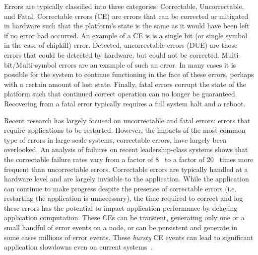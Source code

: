 Errors are typically classified into three categories: Correctable,
Uncorrectable, and Fatal. Correctable errors (CE) are errors that can be
corrected or mitigated in hardware such that the platform's state is the same as it
would have been left if no error had occurred.  An example of a CE is is a single bit 
(or single symbol in the case of chipkill) error.  Detected, uncorrectable errors (DUE) are those
errors that could be detected by hardware, but could not be corrected.
Multi-bit/Multi-symbol errors are an example of such an error.  In many cases
it is possible for the system to continue functioning in the face of these
errors, perhaps with a certain amount of lost state.    Finally, fatal errors corrupt the state of the platform such that continued 
correct operation can no longer be guaranteed.  Recovering from a fatal error typically 
requires a full system halt and a reboot.

Recent research has largely focused on uncorrectable and fatal errors: errors
that require applications to be restarted.  However, the impacts of the most common
type of errors in large-scale systems, correctable errors, have largely been overlooked. An
analysis of failures on recent leadership-class systems shows that the
correctable failure rates vary from a factor of
8~\cite{siddiqua:2017:lifetime,levy:2018:lessons} to a factor of
20~\cite{meza:2015:revisiting} times more frequent than uncorrectable errors.
Correctable errors are typically handled at a hardware level and are largely invisible 
to the application.  While the application can continue to make progress despite the
presence of correctable errors (i.e. restarting the application is unnecessary), the 
time required to correct and log these errors has the potential to impact application
performance by delaying application computation. These CEs can be transient,
generating only one or a small handful of error events on a node, or can be
persistent and generate in some cases millions of error events.    These
\emph{bursty} CE events can lead to significant application slowdowns even on
current systems~\cite{BURSTY}.  

